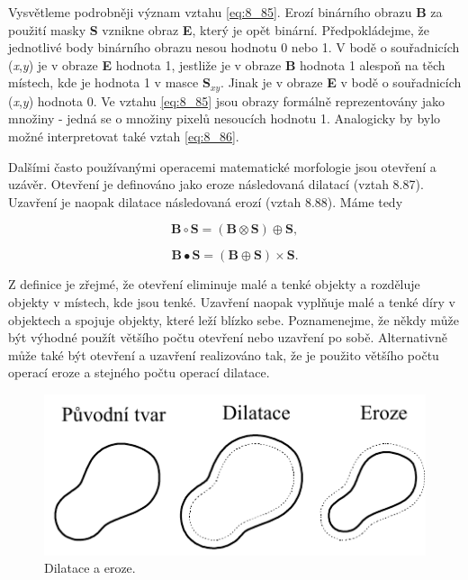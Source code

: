 Vysvětleme podrobněji význam vztahu \eqref{eq:8_85}. Erozí binárního obrazu \textbf{B} za použití masky \textbf{S} vznikne obraz \textbf{E}, který je opět binární. Předpokládejme, že jednotlivé body binárního obrazu nesou hodnotu 0 nebo 1. V bodě o souřadnicích (\textit{x},\textit{y}) je v obraze \textbf{E} hodnota 1, jestliže je v obraze \textbf{B} hodnota 1 alespoň na těch místech, kde je hodnota 1 v masce  \textbf{S}$_{xy}$. Jinak je v obraze \textbf{E} v bodě o souřadnicích (\textit{x},\textit{y}) hodnota 0. Ve vztahu \eqref{eq:8_85} jsou obrazy formálně reprezentovány jako množiny - jedná se o množiny pixelů nesoucích hodnotu 1. Analogicky by bylo možné interpretovat také vztah \eqref{eq:8_86}. 

Dalšími často používanými operacemi matematické morfologie jsou otevření a uzávěr. Otevření je definováno jako eroze následovaná dilatací (vztah 8.87). Uzavření je naopak dilatace následovaná erozí (vztah 8.88). Máme tedy

\begin{equation} \label{eq:8_87}
    \mathbf{B} \circ \mathbf{S} = \left( \mathbf{B} \otimes \mathbf{S} \right) \oplus \mathbf{S},
\end{equation}

\begin{equation} \label{eq:8_88}
    \mathbf{B} \bullet \mathbf{S} = \left( \mathbf{B} \oplus \mathbf{S} \right) \times \mathbf{S}.
\end{equation}

Z definice je zřejmé, že otevření eliminuje malé a tenké objekty a rozděluje objekty v místech, kde jsou tenké. Uzavření naopak vyplňuje malé a tenké díry v objektech a spojuje objekty, které leží blízko sebe. Poznamenejme, že někdy může být výhodné použít většího počtu otevření nebo uzavření po sobě. Alternativně může také být otevření a uzavření realizováno tak, že je použito většího počtu operací eroze a stejného počtu operací dilatace.

\begin{figure}[th]
    \begin{center}
        \includegraphics[scale=0.9]{08_segmentace/images/img_8_25.pdf}
    \end{center}
    \caption{Dilatace a eroze.}
    \label{img:8_25}
\end{figure}

